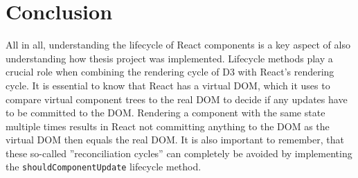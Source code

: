 \section{Conclusion}

All in all, understanding the lifecycle of React components is a key aspect of also understanding how thesis project was implemented. Lifecycle methods play a crucial role when combining the rendering cycle of D3 with React's rendering cycle. It is essential to know that React has a virtual DOM, which it uses to compare virtual component trees to the real DOM to decide if any updates have to be committed to the DOM. Rendering a component with the same state multiple times results in React not committing anything to the DOM as the virtual DOM then equals the real DOM. It is also important to remember, that these so-called ''reconciliation cycles'' can completely be avoided by implementing the \texttt{shouldComponentUpdate} lifecycle method.






